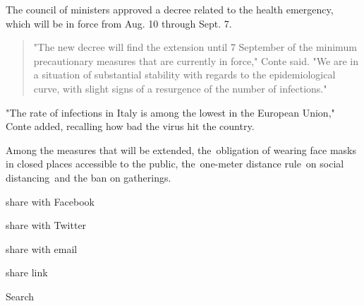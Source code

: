 The council of ministers approved a decree related to the health
emergency, which will be in force from Aug. 10 through Sept. 7.

\begin{quote}
"The new decree will find the extension until 7 September of the minimum
precautionary measures that are currently in force," Conte said. "We are
in a situation of substantial stability with regards to the
epidemiological curve, with slight signs of a resurgence of the number
of infections."
\end{quote}

"The rate of infections in Italy is among the lowest in the European
Union," Conte added, recalling how bad the virus hit the country.~

Among the measures that will be extended, the~obligation of wearing face
masks in closed places accessible to the public, the~one-meter distance
rule~on social distancing~and the ban on gatherings.

share with Facebook

share with Twitter

share with email

share link

Search

